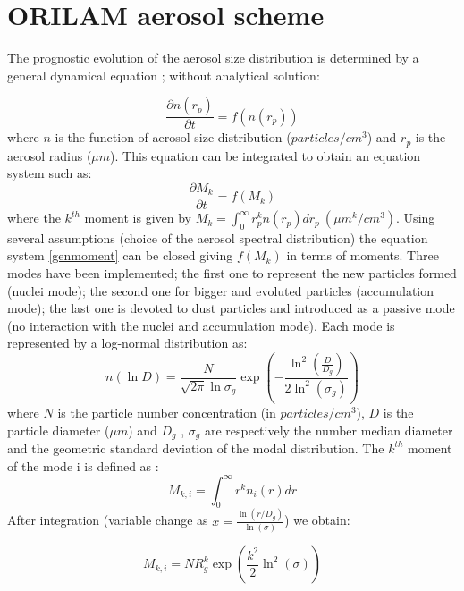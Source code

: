 \chapter{ORILAM aerosol scheme}
\minitoc


The prognostic evolution of the aerosol size distribution is determined by a 
general dynamical
equation \citep{Friedlander-1977}; \citep{Seinfeld-1997} without analytical 
solution: 

\begin{equation}
\frac{\partial n(r_p)}{\partial t} = f(n(r_p))
\label{eqanal}
\end{equation}
where $n$ is the function of aerosol size distribution ($ particles / cm^3$) 
and $r_p$ is the aerosol radius ($\mu m$).
This equation can be integrated to obtain an equation system such as: 
\begin{equation}
\frac{\partial M_k}{\partial t} = f(M_k)
\label{genmoment}
\end{equation}
where the $k^{th}$ moment is given by $M_k = \int_{0}^{\infty} r_{p}^{k} n(r_p) 
dr_p \ (\mu m^k / cm^3) $.
Using several assumptions (choice of the aerosol spectral distribution) the 
equation system \ref{genmoment}
can be closed giving $f(M_k)$ in terms of moments.
Three modes have been implemented; the first one to represent the new particles 
formed (nuclei mode); the second one
for bigger and evoluted particles (accumulation mode); the last one is devoted to 
dust particles and introduced as a passive mode (no interaction with the nuclei and 
accumulation mode). Each mode is represented by a log-normal distribution as:
\begin{equation}
 n(\ln D) = \frac{N}{\sqrt{2 \pi} \ln{\sigma_g}} \exp \left(- \frac{\ln^2 (\frac{D}{D_g})}{2 \ln^2(\sigma_g)}\right) \label{distribution}
\end{equation}
where $N$ is the particle number concentration (in $ particles /cm^3$), $D$ is the particle diameter ($\mu m$) and $D_g$
, $\sigma_g$ are respectively the number median diameter and the geometric 
standard deviation of the modal distribution.
The $k^{th}$ moment of the mode i is defined as :
\begin{equation}
M_{k,i} = \int_{0}^{\infty} r^k n_i(r) dr
\label{defmomentint}
\end{equation}
After integration (variable change as $ x = \frac{\ln (r/D_g)}{\ln(\sigma)}$) we 
obtain:

\begin{equation}
M_{k,i} =  N R^{k}_g \exp \left(\frac{k^2}{2} \ln^2 (\sigma)\right)
\label{defmoment}
\end{equation}

